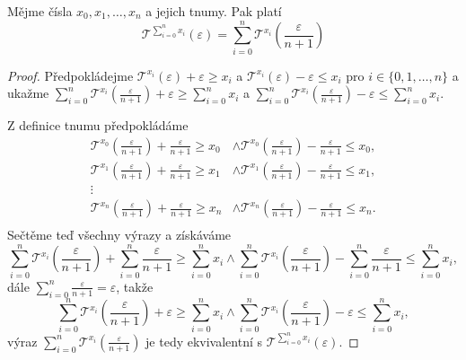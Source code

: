\begin{theorem}
Mějme čísla $x_0, x_1, \ldots, x_n$ a jejich tnumy. Pak platí
\begin{equation}
\mathcal{T}^{\sum_{i=0}^nx_i}(\varepsilon)=\sum_{i=0}^n\mathcal{T}^{x_i}\left(\frac{\varepsilon}{n+1}\right)
\end{equation}

\begin{proof}
Předpokládejme $\mathcal{T}^{x_i}(\varepsilon) + \varepsilon \geq x_i$ a $\mathcal{T}^{x_i}(\varepsilon) - \varepsilon \leq x_i$ pro $i \in \{0, 1, \ldots , n\}$ a ukažme $\sum_{i=0}^n\mathcal{T}^{x_i}\left(\frac{\varepsilon}{n+1}\right) + \varepsilon \geq \sum_{i=0}^nx_i$ a $\sum_{i=0}^n\mathcal{T}^{x_i}\left(\frac{\varepsilon}{n+1}\right) - \varepsilon \leq \sum_{i=0}^nx_i$.

Z definice tnumu předpokládáme
\begin{equation}
\begin{aligned}
\mathcal{T}^{x_0}\left(\frac{\varepsilon}{n+1}\right)+\frac{\varepsilon}{n+1}\geq x_0 &\land \mathcal{T}^{x_0}\left(\frac{\varepsilon}{n+1}\right)-\frac{\varepsilon}{n+1}\leq x_0,\\
\mathcal{T}^{x_1}\left(\frac{\varepsilon}{n+1}\right)+\frac{\varepsilon}{n+1}\geq x_1 &\land \mathcal{T}^{x_1}\left(\frac{\varepsilon}{n+1}\right)-\frac{\varepsilon}{n+1}\leq x_1,\\
\vdots \\
\mathcal{T}^{x_n}\left(\frac{\varepsilon}{n+1}\right)+\frac{\varepsilon}{n+1}\geq x_n &\land \mathcal{T}^{x_n}\left(\frac{\varepsilon}{n+1}\right)-\frac{\varepsilon}{n+1}\leq x_n.\\
\end{aligned}
\end{equation}
Sečtěme teď všechny výrazy a získáváme
\begin{equation}
\sum_{i=0}^n\mathcal{T}^{x_i}\left(\frac{\varepsilon}{n+1}\right) + \sum_{i=0}^n\frac{\varepsilon}{n+1} \geq \sum_{i=0}^nx_i \land \sum_{i=0}^n\mathcal{T}^{x_i}\left(\frac{\varepsilon}{n+1}\right) - \sum_{i=0}^n\frac{\varepsilon}{n+1} \leq \sum_{i=0}^nx_i,
\end{equation}
dále $\sum_{i=0}^n\frac{\varepsilon}{n+1} = \varepsilon$, takže
\begin{equation}
\sum_{i=0}^n\mathcal{T}^{x_i}\left(\frac{\varepsilon}{n+1}\right) + \varepsilon \geq \sum_{i=0}^nx_i \land \sum_{i=0}^n\mathcal{T}^{x_i}\left(\frac{\varepsilon}{n+1}\right) - \varepsilon \leq \sum_{i=0}^nx_i,
\end{equation}
výraz $\sum_{i=0}^n\mathcal{T}^{x_i}\left(\frac{\varepsilon}{n+1}\right)$ je tedy ekvivalentní s $\mathcal{T}^{\sum_{i=0}^nx_i}(\varepsilon)$.
\end{proof}
\end{theorem}

